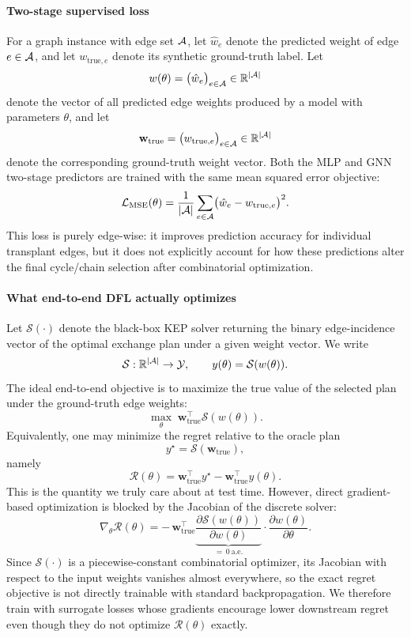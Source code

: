 \documentclass{article}
\begin{document}
\paragraph{Two-stage supervised loss}
For a graph instance with edge set \(\mathcal{A}\), let \(\hat w_e\) denote the predicted weight of edge \(e\in\mathcal{A}\), and let \(w_{\mathrm{true},e}\) denote its synthetic ground-truth label. Let
\[
w(\theta)=\bigl(\hat w_e\bigr)_{e\in\mathcal{A}}\in\mathbb{R}^{|\mathcal{A}|}
\]
denote the vector of all predicted edge weights produced by a model with parameters \(\theta\), and let
\[
\mathbf w_{\mathrm{true}}=\bigl(w_{\mathrm{true},e}\bigr)_{e\in\mathcal{A}}\in\mathbb{R}^{|\mathcal{A}|}
\]
denote the corresponding ground-truth weight vector. Both the MLP and GNN two-stage predictors are trained with the same mean squared error objective:
\[
\mathcal{L}_{\mathrm{MSE}}(\theta)
= \frac{1}{|\mathcal{A}|} \sum_{e\in\mathcal{A}} \bigl(\hat w_e - w_{\mathrm{true},e}\bigr)^2.
\]
This loss is purely edge-wise: it improves prediction accuracy for individual transplant edges, but it does not explicitly account for how these predictions alter the final cycle/chain selection after combinatorial optimization.

\paragraph{What end-to-end DFL actually optimizes}
Let \(\mathcal{S}(\cdot)\) denote the black-box KEP solver returning the binary edge-incidence vector of the optimal exchange plan under a given weight vector. We write
\[
\mathcal{S}: \mathbb{R}^{|\mathcal{A}|}\to\mathcal{Y},
\qquad
y(\theta)=\mathcal{S}(w(\theta)).
\]
The ideal end-to-end objective is to maximize the true value of the selected plan under the ground-truth edge weights:
\[
\max_\theta \; \mathbf w_{\mathrm{true}}^\top \mathcal{S}(w(\theta)).
\]
Equivalently, one may minimize the regret relative to the oracle plan
\[
y^\star = \mathcal{S}(\mathbf w_{\mathrm{true}}),
\]
namely
\[
\mathcal{R}(\theta)
= \mathbf w_{\mathrm{true}}^\top y^\star
- \mathbf w_{\mathrm{true}}^\top y(\theta).
\]
This is the quantity we truly care about at test time. However, direct gradient-based optimization is blocked by the Jacobian of the discrete solver:
\[
\nabla_\theta \mathcal{R}(\theta)
= -\,\mathbf w_{\mathrm{true}}^\top
\underbrace{\frac{\partial \mathcal{S}(w(\theta))}{\partial w(\theta)}}_{\displaystyle =\,0\ \text{a.e.}}
\cdot \frac{\partial w(\theta)}{\partial \theta}.
\]
Since \(\mathcal{S}(\cdot)\) is a piecewise-constant combinatorial optimizer, its Jacobian with respect to the input weights vanishes almost everywhere, so the exact regret objective is not directly trainable with standard backpropagation. We therefore train with surrogate losses whose gradients encourage lower downstream regret even though they do not optimize \(\mathcal{R}(\theta)\) exactly.
\end{document}
